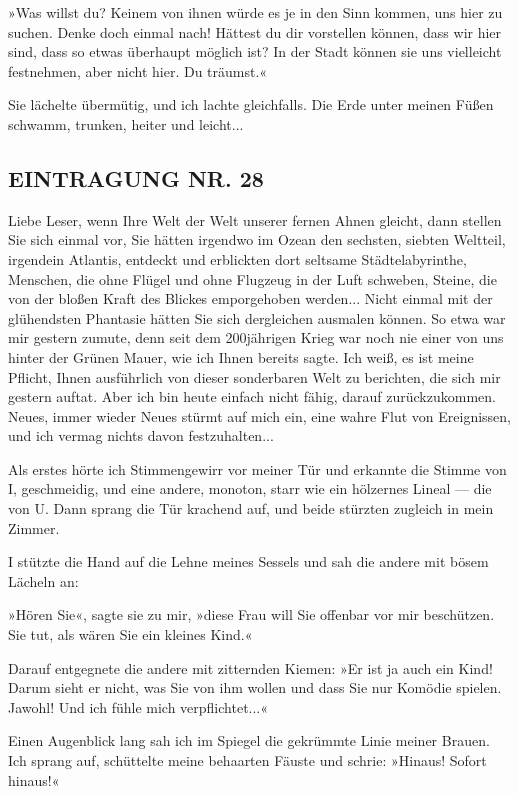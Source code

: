 »Was willst du? Keinem von ihnen würde es je in den Sinn kommen,
uns hier zu suchen. Denke doch einmal nach! Hättest du dir
vorstellen können, dass wir hier sind, dass so etwas überhaupt
möglich ist? In der Stadt können sie uns vielleicht festnehmen,
aber nicht hier. Du träumst.«

Sie lächelte übermütig, und ich lachte gleichfalls. Die Erde unter
meinen Füßen schwamm, trunken, heiter und leicht...

\subsection{EINTRAGUNG NR. 28}

Liebe Leser, wenn Ihre Welt der Welt unserer fernen Ahnen gleicht,
dann stellen Sie sich einmal vor, Sie hätten irgendwo im Ozean den
sechsten, siebten Weltteil, irgendein Atlantis, entdeckt und
erblickten dort seltsame Städtelabyrinthe, Menschen, die ohne
Flügel und ohne Flugzeug in der Luft schweben, Steine, die von der
bloßen Kraft des Blickes emporgehoben werden... Nicht einmal mit
der glühendsten Phantasie hätten Sie sich dergleichen ausmalen
können. So etwa war mir gestern zumute, denn seit dem 200jährigen
Krieg war noch nie einer von uns hinter der Grünen Mauer, wie ich
Ihnen bereits sagte. Ich weiß, es ist meine Pflicht, Ihnen
ausführlich von dieser sonderbaren Welt zu berichten, die sich mir
gestern auftat. Aber ich bin heute einfach nicht fähig, darauf
zurückzukommen. Neues, immer wieder Neues stürmt auf mich ein, eine
wahre Flut von Ereignissen, und ich vermag nichts davon
festzuhalten...

Als erstes hörte ich Stimmengewirr vor meiner Tür und erkannte die
Stimme von I, geschmeidig, und eine andere, monoton, starr wie ein
hölzernes Lineal — die von U. Dann sprang die Tür krachend auf, und
beide stürzten zugleich in mein Zimmer.

I stützte die Hand auf die Lehne meines Sessels und sah die andere
mit bösem Lächeln an:

»Hören Sie«, sagte sie zu mir, »diese Frau will Sie offenbar vor
mir beschützen. Sie tut, als wären Sie ein kleines Kind.«

Darauf entgegnete die andere mit zitternden Kiemen: »Er ist ja auch
ein Kind! Darum sieht er nicht, was Sie von ihm wollen und dass Sie
nur Komödie spielen. Jawohl! Und ich fühle mich verpflichtet...«

Einen Augenblick lang sah ich im Spiegel die gekrümmte Linie meiner
Brauen. Ich sprang auf, schüttelte meine behaarten Fäuste und
schrie: »Hinaus! Sofort hinaus!«

